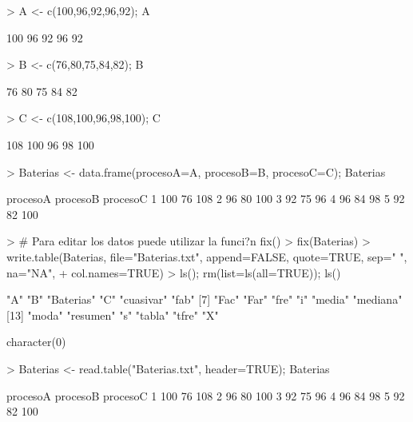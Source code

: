 \documentclass{article}
\begin{document}
\begin{Schunk}
\begin{Sinput}
> A <- c(100,96,92,96,92); A
\end{Sinput}
\begin{Soutput}
[1] 100  96  92  96  92
\end{Soutput}
\begin{Sinput}
> B <- c(76,80,75,84,82); B
\end{Sinput}
\begin{Soutput}
[1] 76 80 75 84 82
\end{Soutput}
\begin{Sinput}
> C <- c(108,100,96,98,100); C
\end{Sinput}
\begin{Soutput}
[1] 108 100  96  98 100
\end{Soutput}
\begin{Sinput}
> Baterias <- data.frame(procesoA=A, procesoB=B, procesoC=C); Baterias
\end{Sinput}
\begin{Soutput}
  procesoA procesoB procesoC
1      100       76      108
2       96       80      100
3       92       75       96
4       96       84       98
5       92       82      100
\end{Soutput}
\begin{Sinput}
> # Para editar los datos puede utilizar la funci?n fix()
> fix(Baterias)
> write.table(Baterias, file="Baterias.txt", append=FALSE, quote=TRUE, sep=" ", na="NA",
+ col.names=TRUE)
> ls(); rm(list=ls(all=TRUE)); ls()
\end{Sinput}
\begin{Soutput}
 [1] "A"        "B"        "Baterias" "C"        "cuasivar" "fab"     
 [7] "Fac"      "Far"      "fre"      "i"        "media"    "mediana" 
[13] "moda"     "resumen"  "s"        "tabla"    "tfre"     "X"       
\end{Soutput}
\begin{Soutput}
character(0)
\end{Soutput}
\begin{Sinput}
> Baterias <- read.table("Baterias.txt", header=TRUE); Baterias
\end{Sinput}
\begin{Soutput}
  procesoA procesoB procesoC
1      100       76      108
2       96       80      100
3       92       75       96
4       96       84       98
5       92       82      100
\end{Soutput}
\begin{Sinput}

\end{Sinput}
\end{Schunk}
\end{document}
